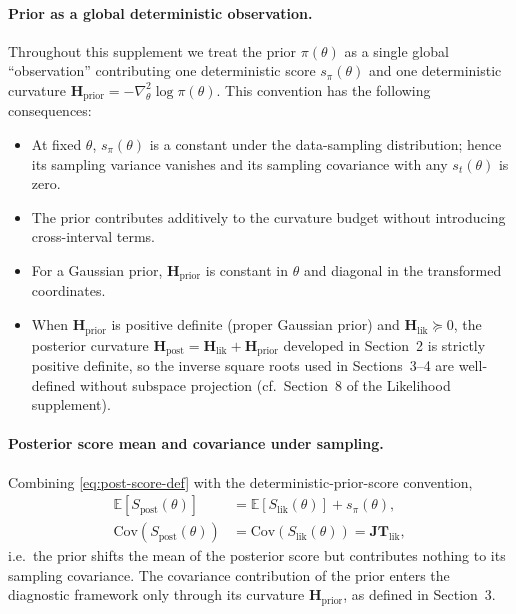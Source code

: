 \documentclass[11pt]{article}
\begin{document}
\paragraph{Prior as a global deterministic observation.}
Throughout this supplement we treat the prior $\pi(\theta)$ as a single global ``observation'' contributing one deterministic score $s_\pi(\theta)$ and one deterministic curvature $\mathbf H_{\mathrm{prior}} = -\nabla_\theta^2 \log \pi(\theta)$. This convention has the following consequences:
\begin{itemize}
\item At fixed $\theta$, $s_\pi(\theta)$ is a constant under the data-sampling distribution; hence its sampling variance vanishes and its sampling covariance with any $s_t(\theta)$ is zero.
\item The prior contributes additively to the curvature budget without introducing cross-interval terms.
\item For a Gaussian prior, $\mathbf H_{\mathrm{prior}}$ is constant in $\theta$ and diagonal in the transformed coordinates.
\item When $\mathbf H_{\mathrm{prior}}$ is positive definite (proper Gaussian prior) and $\mathbf H_{\mathrm{lik}} \succeq 0$, the posterior curvature $\mathbf H_{\mathrm{post}} = \mathbf H_{\mathrm{lik}} + \mathbf H_{\mathrm{prior}}$ developed in Section~2 is strictly positive definite, so the inverse square roots used in Sections~3--4 are well-defined without subspace projection (cf.\ Section~8 of the Likelihood supplement).
\end{itemize}

\paragraph{Posterior score mean and covariance under sampling.}
Combining \eqref{eq:post-score-def} with the deterministic-prior-score convention,
\begin{align}
\mathbb{E}[S_{\mathrm{post}}(\theta)]
&=
\mathbb{E}[S_{\mathrm{lik}}(\theta)] + s_\pi(\theta),
\label{eq:post-score-mean}\\
\mathrm{Cov}(S_{\mathrm{post}}(\theta))
&=
\mathrm{Cov}(S_{\mathrm{lik}}(\theta))
=
\mathbf{JT}_{\mathrm{lik}},
\label{eq:post-score-cov}
\end{align}
i.e.\ the prior shifts the mean of the posterior score but contributes nothing to its sampling covariance. The covariance contribution of the prior enters the diagnostic framework only through its curvature $\mathbf H_{\mathrm{prior}}$, as defined in Section~3.
\end{document}

